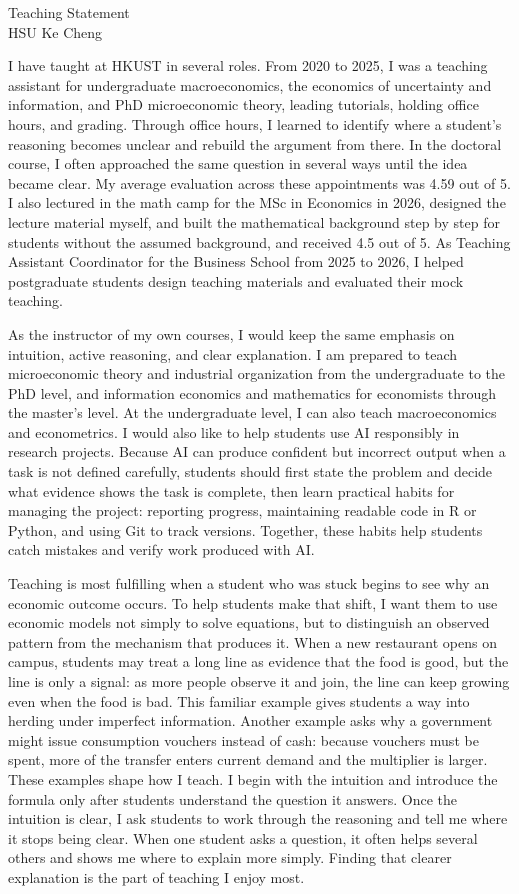 \documentclass[11pt]{article}
\begin{document}
\begin{center}
{\Large Teaching Statement}\\[0.3em]
HSU Ke Cheng
\end{center}

I have taught at HKUST in several roles. From 2020 to 2025, I was a teaching assistant for undergraduate macroeconomics, the economics of uncertainty and information, and PhD microeconomic theory, leading tutorials, holding office hours, and grading. Through office hours, I learned to identify where a student's reasoning becomes unclear and rebuild the argument from there. In the doctoral course, I often approached the same question in several ways until the idea became clear. My average evaluation across these appointments was 4.59 out of 5. I also lectured in the math camp for the MSc in Economics in 2026, designed the lecture material myself, and built the mathematical background step by step for students without the assumed background, and received 4.5 out of 5. As Teaching Assistant Coordinator for the Business School from 2025 to 2026, I helped postgraduate students design teaching materials and evaluated their mock teaching.

As the instructor of my own courses, I would keep the same emphasis on intuition, active reasoning, and clear explanation. I am prepared to teach microeconomic theory and industrial organization from the undergraduate to the PhD level, and information economics and mathematics for economists through the master's level. At the undergraduate level, I can also teach macroeconomics and econometrics. I would also like to help students use AI responsibly in research projects. Because AI can produce confident but incorrect output when a task is not defined carefully, students should first state the problem and decide what evidence shows the task is complete, then learn practical habits for managing the project: reporting progress, maintaining readable code in R or Python, and using Git to track versions. Together, these habits help students catch mistakes and verify work produced with AI.

Teaching is most fulfilling when a student who was stuck begins to see why an economic outcome occurs. To help students make that shift, I want them to use economic models not simply to solve equations, but to distinguish an observed pattern from the mechanism that produces it. When a new restaurant opens on campus, students may treat a long line as evidence that the food is good, but the line is only a signal: as more people observe it and join, the line can keep growing even when the food is bad. This familiar example gives students a way into herding under imperfect information. Another example asks why a government might issue consumption vouchers instead of cash: because vouchers must be spent, more of the transfer enters current demand and the multiplier is larger. These examples shape how I teach. I begin with the intuition and introduce the formula only after students understand the question it answers. Once the intuition is clear, I ask students to work through the reasoning and tell me where it stops being clear. When one student asks a question, it often helps several others and shows me where to explain more simply. Finding that clearer explanation is the part of teaching I enjoy most.
\end{document}
